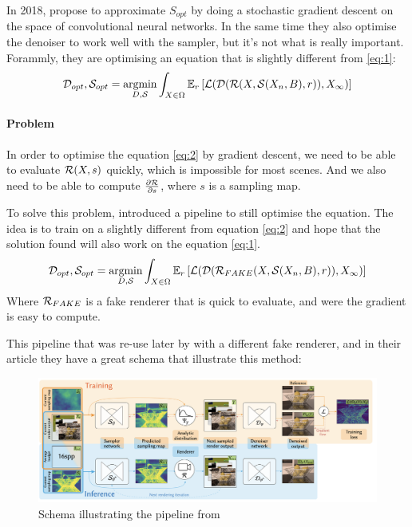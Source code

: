 \documentclass{classeENS}
\begin{document}
In 2018, \cite{kuznetsov2018deep} propose to approximate $S_{opt}$ by doing a stochastic
gradient descent on the space of convolutional neural networks. In the same time they also 
optimise the denoiser to work well with the sampler, but it's not what is really important. 
Forammly, they are optimising an equation that is slightly different from \ref{eq:1}:
\begin{equation}
    \label{eq:2}
    \mathcal D_{opt}, \mathcal S_{opt} = \operatorname*{argmin}_{D, \mathcal S} \int_{X\in\Omega} \mathbb E_r \left [ \mathcal L (\mathcal D (\mathcal R(X, \mathcal S(X_n, B), r)), X_\infty) \right ]
\end{equation}

\paragraph*{Problem} In order to optimise the equation \ref{eq:2} by gradient descent,
we need to be able to evaluate $\mathcal R(X,s)$ quickly, which is impossible for most scenes.
And we also need to be able to compute $\frac{\partial \mathcal R}{\partial s}$, where $s$ is a 
sampling map.


\par To solve this problem, \cite{kuznetsov2018deep} introduced a pipeline to still optimise
the equation. The idea is to train on a slightly different from equation \ref{eq:2} and hope 
that the solution found will also work on the equation \ref{eq:1}.
\begin{equation}
    \label{eq:3}
    \mathcal D_{opt}, \mathcal S_{opt} = \operatorname*{argmin}_{D, \mathcal S} \int_{X\in\Omega} \mathbb E_r \left [ \mathcal L (\mathcal D (\mathcal R_{FAKE}(X, \mathcal S(X_n, B), r)), X_\infty) \right ]
\end{equation}
Where $\mathcal R_{FAKE}$ is a fake renderer that is quick to evaluate, and were the gradient is easy
to compute.

\par This pipeline that was re-use later by \cite{10.1145/3550454.3555515} with a different fake 
renderer, and in their article they have a great schema that illustrate this method:

\begin{figure}[H]
    \centering
    \caption{Schema illustrating the pipeline from \cite{10.1145/3550454.3555515}}
    \includegraphics[width=160mm]{image/pipeline.png}
\end{figure}
\end{document}

